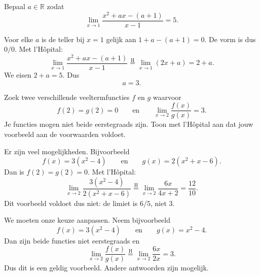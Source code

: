 \documentclass{ximera}
\begin{document}



\begin{oefening}{\oefG}

Bepaal \(a\in\mathbb{R}\) zodat
\[\lim_{x\to1}\frac{x^2+ax-(a+1)}{x-1}=5.\]

\begin{oplossing}
Voor elke \(a\) is de teller bij \(x=1\) gelijk aan
\(1+a-(a+1)=0\). De vorm is dus \(0/0\). Met l'Hôpital:
\[
\lim_{x\to1}\frac{x^2+ax-(a+1)}{x-1}
\overset{\mathrm H}{=}
\lim_{x\to1}(2x+a)=2+a.
\]
We eisen \(2+a=5\). Dus
\[\boxed{a=3}.\]
\end{oplossing}
\end{oefening}

\begin{oefening}{\oefG}

Zoek twee verschillende veeltermfuncties \(f\) en \(g\) waarvoor
\[
f(2)=g(2)=0
\qquad\text{en}\qquad
\lim_{x\to2}\frac{f(x)}{g(x)}=3.
\]
Je functies mogen niet beide eerstegraads zijn. Toon met l'Hôpital aan
dat jouw voorbeeld aan de voorwaarden voldoet.

\begin{oplossing}
Er zijn veel mogelijkheden. Bijvoorbeeld
\[f(x)=3(x^2-4)\qquad\text{en}\qquad g(x)=2(x^2+x-6).\]
Dan is \(f(2)=g(2)=0\). Met l'Hôpital:
\[
\lim_{x\to2}\frac{3(x^2-4)}{2(x^2+x-6)}
\overset{\mathrm H}{=}
\lim_{x\to2}\frac{6x}{4x+2}
=\frac{12}{10}.
\]
Dit voorbeeld voldoet dus niet: de limiet is \(6/5\), niet \(3\).

We moeten onze keuze aanpassen. Neem bijvoorbeeld
\[f(x)=3(x^2-4)\qquad\text{en}\qquad g(x)=x^2-4.\]
Dan zijn beide functies niet eerstegraads en
\[
\lim_{x\to2}\frac{f(x)}{g(x)}
\overset{\mathrm H}{=}
\lim_{x\to2}\frac{6x}{2x}=3.
\]
Dus dit is een geldig voorbeeld. Andere antwoorden zijn mogelijk.
\end{oplossing}
\end{oefening}
\end{document}
